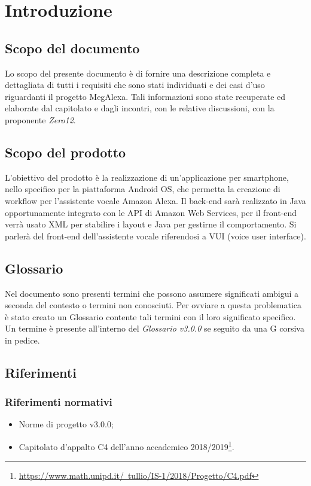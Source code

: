 \clearpage
\section{Introduzione}
\label{sec:intro}
\subsection{Scopo del documento}
Lo scopo del presente documento è di fornire una descrizione completa e dettagliata di tutti i requisiti che sono stati individuati e dei casi d'uso riguardanti il progetto MegAlexa.
Tali informazioni sono state recuperate ed elaborate dal capitolato e dagli incontri, con le relative discussioni, con la proponente \emph{Zero12}.
\subsection{Scopo del prodotto}
L'obiettivo del prodotto è la realizzazione di un'applicazione per smartphone, nello specifico per la piattaforma Android OS, che permetta la creazione di workflow per l'assistente vocale Amazon Alexa. Il back-end sarà realizzato in Java opportunamente integrato con le API di Amazon Web Services, per il front-end verrà usato XML per stabilire i layout e Java per gestirne il comportamento. Si parlerà del front-end dell'assistente vocale riferendosi a VUI (voice user interface).
\subsection{Glossario}
Nel documento sono presenti termini che possono assumere significati ambigui a seconda del contesto o termini non conosciuti. Per ovviare a questa problematica è stato creato un Glossario contente tali termini con il loro significato specifico. Un termine è presente all'interno del \emph{Glossario v3.0.0} se seguito da una G corsiva in pedice.
\subsection{Riferimenti}
\subsubsection{Riferimenti normativi}
\begin{itemize}
	\item Norme di progetto v3.0.0;
	\item Capitolato d’appalto C4 dell'anno accademico 2018/2019\footnote{\href{https://www.math.unipd.it/~tullio/IS-1/2018/Progetto/C4.pdf}{https://www.math.unipd.it/~tullio/IS-1/2018/Progetto/C4.pdf}}.
\end{itemize}
